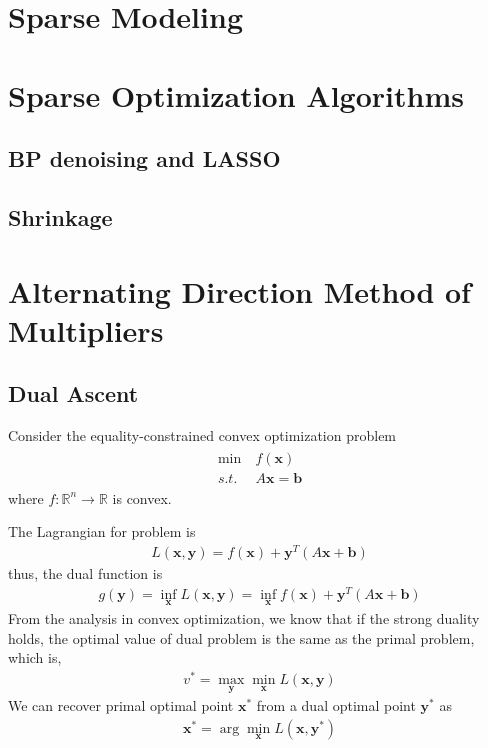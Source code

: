\section{Sparse Modeling}
\section{Sparse Optimization Algorithms}
\subsection{BP denoising and LASSO}
\subsection{Shrinkage}
\section{Alternating Direction Method of Multipliers}
\subsection{Dual Ascent}
Consider the equality-constrained convex optimization problem
\begin{align}
    \begin{array}{ll}
        \min \ & f(\mathbf{x}) \\
        s.t. \ & A\mathbf{x} = \mathbf{b}
    \end{array}
    \label{pro:dual-ascent}
\end{align}
where $f: \mathbb{R}^n \rightarrow \mathbb{R}$ is convex.
\par
The Lagrangian for problem is
\begin{align}
    L(\mathbf{x}, \mathbf{y}) = f(\mathbf{x}) + \mathbf{y}^T
    (A\mathbf{x} + \mathbf{b})
\end{align}
thus, the dual function is
\begin{align}
    g(\mathbf{y}) = \inf_\mathbf{x} L(\mathbf{x}, \mathbf{y})
    = \inf_{\mathbf{x}} f(\mathbf{x}) + \mathbf{y}^T
    (A\mathbf{x} + \mathbf{b})
\end{align}
From the analysis in convex optimization,
we know that if the strong duality holds,
the optimal value of dual problem is the same
as the primal problem, which is,
\begin{align}
    v^* = \max_\mathbf{y} \min_\mathbf{x} L(\mathbf{x}, \mathbf{y})
\end{align}
We can recover primal optimal point $\mathbf{x}^*$
from a dual optimal point $\mathbf{y}^*$ as
\begin{align}
    \mathbf{x}^* = \arg\min_{\mathbf{x}} L(\mathbf{x}, \mathbf{y}^*)
\end{align}


